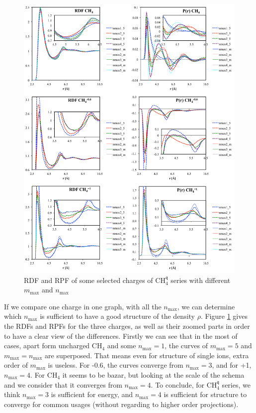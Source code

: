 \begin{figure}[!th]
\begin{centering}
\includegraphics[width=1\columnwidth]{_figure/results/ch4_series}
\par\end{centering}
\caption{\acs{RDF} and \acs{RPF} of some selected charges of $\mathrm{C}\mathrm{H}_{4}^{\mathfrak{q}}$
series with different $m_{\max}$ and $n_{\max}$\label{fig:RDF-and-polarization}}
\end{figure}

If we compare one charge in one graph, with all the $n_{\max}$, we
can determine which $n_{\max}$ is sufficient to have a good structure
of the density $\rho$. Figure \ref{fig:RDF-and-polarization} gives
the \acs{RDF}s and \acs{RPF}s for the three charges, as well as
their zoomed parts in order to have a clear view of the differences.
Firstly we can see that in the most of cases, apart form uncharged
$\mathrm{C}\mathrm{H}_{4}$ and some $n_{\max}=1$, the curves of
$m_{\max}=5$ and $m_{\max}=n_{\max}$ are superposed. That means
even for structure of single ions, extra order of $m_{\max}$ is useless.
For -0.6, the curves converge from $n_{\max}=3$, and for +1, $n_{\max}=4$.
For $\mathrm{C}\mathrm{H}_{4}$ it seems to be bazar, but looking
at the scale of the schema and we consider that it converges from
$n_{\max}=4$. To conclude, for $\mathrm{C}\mathrm{H}_{4}^{\mathfrak{q}}$
series, we think $n_{\max}=3$ is sufficient for energy, and $n_{\max}=4$
is sufficient for structure to converge for common usages (without
regarding to higher order projections).

